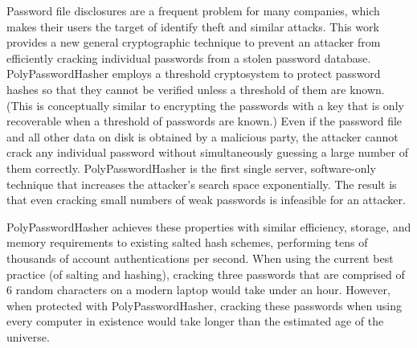 Password file disclosures are a frequent problem for many companies, which
makes their users the target of identify theft and similar attacks.   
This work provides a new general cryptographic technique to prevent an
attacker from efficiently cracking individual passwords from a stolen
password database.   PolyPasswordHasher employs a threshold cryptosystem to protect
password hashes so that they cannot be verified unless a threshold of them
are known.   (This is conceptually similar to encrypting the passwords with a 
key that is only recoverable when a threshold of passwords are known.)
Even if the password file and all other data on disk is obtained by a 
malicious party, the attacker cannot crack any individual password without 
simultaneously guessing a large number of them correctly.   PolyPasswordHasher
is the first single server, software-only technique that increases
the attacker's search space exponentially.   The result is that even cracking 
small numbers of weak passwords is infeasible for an attacker.   

PolyPasswordHasher achieves these properties with similar efficiency, storage,
and memory requirements to existing salted hash schemes,
performing
tens of thousands of account authentications per second.    
When using the current best practice (of salting and hashing), 
cracking three passwords that are comprised of 6 random characters on
a modern laptop would take under an hour.  However, when protected with
PolyPasswordHasher, cracking these passwords when using every computer in existence
would take longer than the estimated age of the universe.
